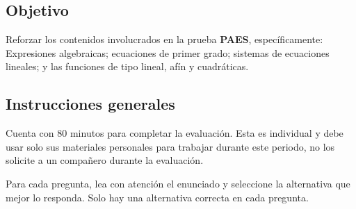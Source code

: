 \documentclass[
  titulo=Prueba,
  subtitulo=Álgebra y funciones,
  curso=Tercero medio A,
  fecha=2025-09-23,
  con nombre,
  ppp=1
]{srs3}
\begin{document}
\subsection*{Objetivo}
Reforzar los contenidos involucrados en la prueba \textbf{PAES}, específicamente:
Expresiones algebraicas; ecuaciones de primer grado; sistemas de ecuaciones
lineales; y las funciones de tipo lineal, afín y cuadráticas.
\subsection*{Instrucciones generales}
Cuenta con 80 minutos para completar la evaluación. Esta es individual y debe usar solo sus materiales
personales para trabajar durante este periodo, no los solicite a un compañero durante la evaluación. \par
Para cada pregunta, lea con atención el enunciado y seleccione la
alternativa que mejor lo responda. Solo hay una alternativa
correcta en cada pregunta.
\separador
\end{document}
